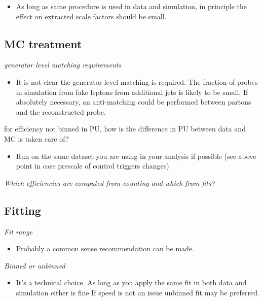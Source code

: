 \documentclass[11pt,a4paper]{article}
\begin{document}
\begin{itemize}
    \item As long as same procedure is used in data and simulation, in principle the 
effect on extracted scale factors should be small.  
\end{itemize}


\subsection{MC treatment}

{\it generator level matching requirements}\\

\begin{itemize}
    \item It is not clear the generator level matching is required.  
The fraction of probes in simulation from fake leptons from additional jets
is likely to be small.  If absolutely necessary, an anti-matching could
be performed between partons and the reconstructed probe.
\end{itemize}

{for efficiency not binned in PU, how is the difference in PU between data and MC is taken care of?}\\

\begin{itemize}
    \item Run on the same dataset you are using in your analysis if possible (see above point 
in case prescale of control triggers changes).
\end{itemize}

{\it Which efficiencies are computed from counting and which from fits?}

\subsection{Fitting}

{\it Fit range} \\

\begin{itemize}
    \item Probably a common sense recommendation can be made.
\end{itemize}


{\it Binned or unbinned} \\

\begin{itemize}
    \item It's a technical choice. As long as 
you apply the same fit in both data and simulation either is fine
If speed is not an issue unbinned fit may be preferred.
\end{itemize}
\end{document}
